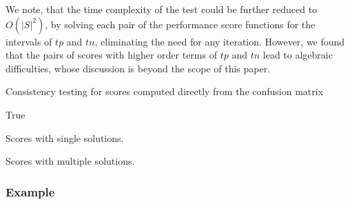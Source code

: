 \documentclass[5p, final]{elsarticle}
\begin{document}
We note, that the time complexity of the test could be further reduced to $O(\vert S\vert^2)$, by solving each pair of the performance score functions for the intervals of $tp$ and $tn$, eliminating the need for any iteration. However, we found that the pairs of scores with higher order terms of $tp$ and $tn$ lead to algebraic difficulties, whose discussion is beyond the scope of this paper.



\begin{algorithm}
\caption{Consistency testing for scores computed directly from the confusion matrix}\label{alg1}
\begin{small}
\Return True\;
\end{small}
\end{algorithm}

\begin{table}[t!]
\caption{Scores with single solutions.}
\label{tab2}
\begin{scriptsize}

\end{scriptsize}
\end{table}

\begin{table}[t!]
\caption{Scores with multiple solutions.}
\label{tab3}
\begin{scriptsize}

\end{scriptsize}
\end{table}




\subsubsection{Example}
\end{document}
